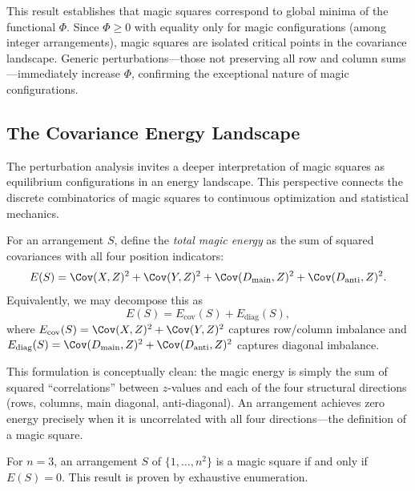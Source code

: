 This result establishes that magic squares correspond to global minima of the functional $\Phi$.
Since $\Phi \geq 0$ with equality only for magic configurations (among integer arrangements),
magic squares are isolated critical points in the covariance landscape.
Generic perturbations---those not preserving all row and column sums---immediately increase $\Phi$,
confirming the exceptional nature of magic configurations.

\subsection{The Covariance Energy Landscape}
\label{sec:energy_landscape}

The perturbation analysis invites a deeper interpretation of magic squares 
as equilibrium configurations in an energy landscape.
This perspective connects the discrete combinatorics of magic squares 
to continuous optimization and statistical mechanics.

\begin{definition}
\label{def:covariance_energy}
For an arrangement $S$, define the \emph{total magic energy} as the sum of squared covariances 
with all four position indicators:
\begin{equation}
E(S) = \Cov(X, Z)^2 + \Cov(Y, Z)^2 + \Cov(D_{\mathrm{main}}, Z)^2 + \Cov(D_{\mathrm{anti}}, Z)^2.
\label{eq:total_energy}
\end{equation}
Equivalently, we may decompose this as
\[
E(S) = E_{\text{cov}}(S) + E_{\text{diag}}(S),
\]
where $E_{\text{cov}}(S) = \Cov(X, Z)^2 + \Cov(Y, Z)^2$ captures row/column imbalance
and $E_{\text{diag}}(S) = \Cov(D_{\mathrm{main}}, Z)^2 + \Cov(D_{\mathrm{anti}}, Z)^2$ captures diagonal imbalance.
\end{definition}

This formulation is conceptually clean: the magic energy is simply the sum of squared 
``correlations'' between $z$-values and each of the four structural directions 
(rows, columns, main diagonal, anti-diagonal).
An arrangement achieves zero energy precisely when it is uncorrelated with all four directions---the 
definition of a magic square.

\begin{theorem}
\label{thm:energy_char}
For $n = 3$, an arrangement $S$ of $\{1, \ldots, n^2\}$ is a magic square 
if and only if $E(S) = 0$.
This result is proven by exhaustive enumeration.
\end{theorem}

